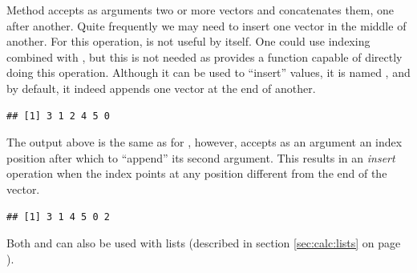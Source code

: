 \documentclass[krantz2]{krantz}\usepackage{knitr}
\begin{document}
Method  accepts as arguments two or more vectors and concatenates them, one after another. Quite frequently we may need to insert one vector in the middle of another. For this operation,  is not useful by itself. One could use indexing combined with , but this is not needed as \Rlang provides a function capable of directly doing this operation. Although it can be used to ``insert'' values, it is named , and by default, it indeed appends one vector at the end of another.

\begin{knitrout}\footnotesize
{}\color{fgcolor}\begin{kframe}
\begin{alltt}
\end{alltt}
\begin{verbatim}
## [1] 3 1 2 4 5 0
\end{verbatim}
\end{kframe}
\end{knitrout}

The output above is the same as for , however,  accepts as an argument an index position after which to ``append'' its second argument. This results in an \emph{insert} operation when the index points at any position different from the end of the vector.

\begin{knitrout}\footnotesize
{}\color{fgcolor}\begin{kframe}
\begin{alltt}
    \hlstd{=} \hlstd{)}
\end{alltt}
\begin{verbatim}
## [1] 3 1 4 5 0 2
\end{verbatim}
\end{kframe}
\end{knitrout}

Both  and  can also be used with lists (described in section \ref{sec:calc:lists} on page \pageref{sec:calc:lists}).
\end{document}
